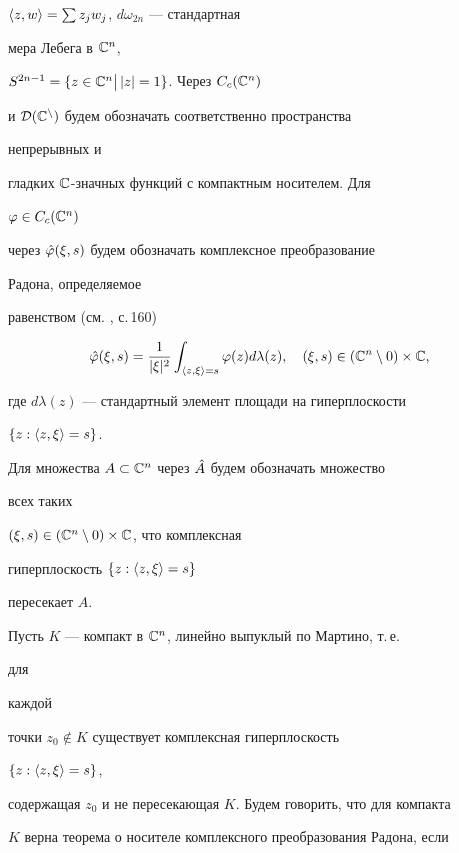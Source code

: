 $\langle z,w\rangle=\sum z_jw_j$, $d\omega_{2n}$ --- стандартная 


мера Лебега в $\Bbb C^n$, 


$S^{2n-1}=\{z\in\Bbb C^n\bigl|\,\bigr.|z|=1\}$. Через $C_c(\Bbb C^n)$ 


и $\cal D(\Bbb C^n)$ будем обозначать соответственно пространства 


непрерывных и 


гладких $\Bbb C$-значных функций с компактным носителем. Для 


$\varphi\in C_c(\Bbb C^n)$ 


через $\Hat\varphi(\xi,s)$ будем обозначать комплексное преобразование 


Радона, определяемое 


равенством (см. \cite{Gel}, с.\,160) 


\begin{equation} 


\Hat\varphi(\xi,s)=\frac{1}{|\xi|^2}\int_{\la z,\xi\ra=s} 


\varphi(z)d\lambda(z),\quad (\xi,s)\in(\Bbb C^n\setminus 0)\times \Bbb C, 


\end{equation} 


где $d\lambda(z)$ --- стандартный элемент площади на гиперплоскости 


$\{z:\langle z,\xi\rangle=s\}$. 


 


Для множества $A\subset\Bbb C^n$ через $\Hat A$ будем обозначать множество 


всех таких 


$(\xi,s)\in(\Bbb C^n\setminus 0)\times \Bbb C$, что комплексная 


гиперплоскость $\{z:\langle z,\xi\rangle=s\}$ 


пересекает $A$. 


 


Пусть $K$ --- компакт в $\Bbb C^n$, линейно выпуклый по Мартино, т.\,е. 


для 


каждой 


точки $z_0\notin K$ существует комплексная гиперплоскость 


$\{z:\langle z,\xi\rangle=s\}$, 


содержащая $z_0$ и не пересекающая $K$. Будем говорить, что для компакта 


$K$ верна теорема о носителе комплексного преобразования Радона, если 


